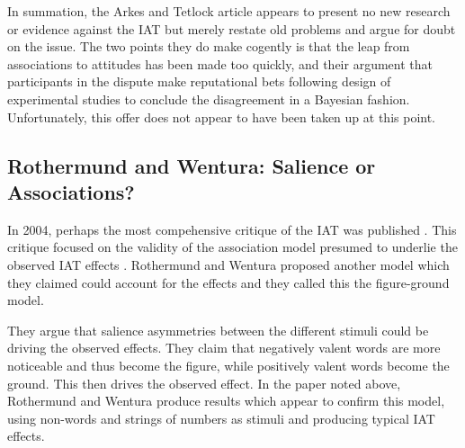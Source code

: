 
In summation, the Arkes and Tetlock article appears to present no new research or evidence against the IAT but merely restate old problems and argue for doubt on the issue. The two points they do make cogently is that the leap from associations to attitudes has been made too quickly, and their argument that participants in the dispute make reputational bets following design of experimental studies to conclude the disagreement in a Bayesian fashion. Unfortunately, this offer does not appear to have been taken up at this point. 

\subsection{Rothermund and Wentura: Salience or Associations?}
\label{sec:roth-went-sali}
In 2004, perhaps the most compehensive critique of the IAT was published \cite{Rothermund2004}. This critique focused on the validity of the association model presumed to underlie the observed IAT effects \cite{Greenwald1998}. Rothermund and Wentura proposed another model which they claimed could account for the effects and they called this the figure-ground model. 

They argue that salience asymmetries between the different stimuli could be driving the observed effects. They claim that negatively valent words are more noticeable and thus become the figure, while positively valent words become the ground. This then drives the observed  effect. In the paper noted above, Rothermund and Wentura produce results which appear to confirm this model, using non-words and strings of numbers as stimuli and producing typical IAT effects. 

